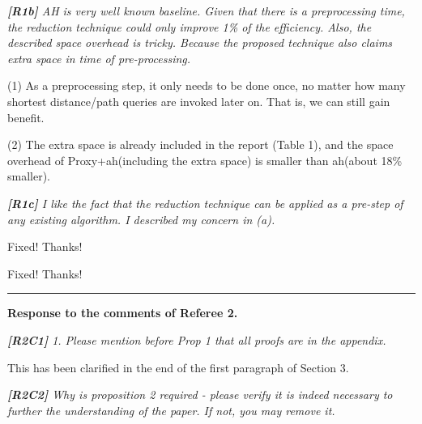 \documentclass[11pt]{letter}
\newcommand{\vs}{\vspace{1ex}}
\newcommand{\svs}{\vspace{0.36ex}}
\newcommand{\ah}{{\sc ah}\xspace}
\begin{document}
\noindent
{\em
{\bf [R1b]}   AH is very well known baseline. Given that there is a preprocessing time, the reduction technique could only improve 1\% of the efficiency. Also, the described space overhead is tricky. Because the proposed technique also claims extra space in time of pre-processing.}
\svs

(1) As a preprocessing step, it only needs to be done once, no matter how many shortest distance/path queries are invoked later on. That is, we can still gain benefit.

(2) The extra space is already included in the report (Table 1), and the space overhead of Proxy+\ah (including the extra space) is smaller than \ah (about 18\% smaller).



\noindent
{\em{\bf[R1c]} I like the fact that the reduction technique can be applied as a pre-step of any existing algorithm. I described my concern in (a).}
\svs



\svs



\svs


\svs

Fixed! Thanks!

\svs


Fixed! Thanks!



\vspace{2.8ex}
\hrule
\vspace{0.6ex}
{\bf Response to the comments of Referee 2.}



\vs
\noindent
{\em
{\bf [R2C1]}
1. Please mention before Prop 1 that all proofs are in the appendix.}
\svs

This has been clarified in the end of the first paragraph of Section 3.

\vs
\noindent
{\em
{\bf [R2C2]} Why is proposition 2 required - please verify it is indeed necessary to further the understanding of the paper. If not, you may remove it.}
\svs
\end{document}
